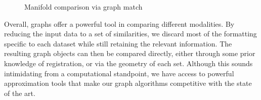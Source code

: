 \documentclass[journal]{IEEEtran}
\begin{document}
\begin{figure}
  \centering {}%
  \hfill {}%
  \caption{Manifold comparison via graph match}
  \label{fig:ChangeDetect}
\end{figure}

Overall, graphs offer a powerful tool in comparing different modalities. By
reducing the input data to a set of similarities, we discard most of the
formatting specific to each dataset while still retaining the relevant
information. The resulting graph objects can then be compared directly, either
through some prior knowledge of registration, or via the geometry of each
set. Although this sounds intimidating from a computational standpoint, we have
access to powerful approximation tools that make our graph algorithms
competitive with the state of the art.
\vspace*{-0.5cm}
 
\end{document}

